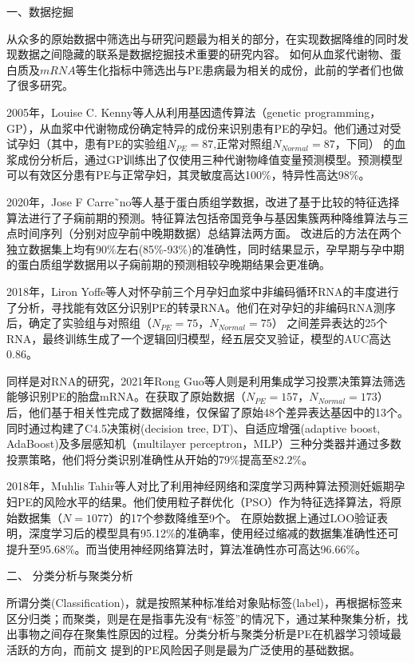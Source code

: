 一、数据挖掘

从众多的原始数据中筛选出与研究问题最为相关的部分，在实现数据降维的同时发现数据之间隐藏的联系是数据挖掘技术重要的研究内容。
如何从血浆代谢物、蛋白质及$mRNA$等生化指标中筛选出与PE患病最为相关的成份，此前的学者们也做了很多研究。

2005年，Louise C. Kenny等人\cite{Kenny2005}从利用基因遗传算法（genetic programming，GP），从血浆中代谢物成份确定特异的成份来识别患有PE的孕妇。他们通过对受试孕妇（其中，患有PE的实验组$N_{PE}=87$,正常对照组$N_{Normal}=87$，下同）
的血浆成份分析后，通过GP训练出了仅使用三种代谢物峰值变量预测模型。预测模型可以有效区分患有PE与正常孕妇，其灵敏度高达100\%，特异性高达98\%。

2020年，Jose F Carre˜no等人\cite{Carreno2020}基于蛋白质组学数据，改进了基于比较的特征选择算法进行了子痫前期的预测。特征算法包括帝国竞争与基因集簇两种降维算法与三点时间序列（分别对应孕前中晚期数据）总结算法两方面。
改进后的方法在两个独立数据集上均有90\%左右(85\%-93\%)的准确性，同时结果显示，孕早期与孕中期的蛋白质组学数据用以子痫前期的预测相较孕晚期结果会更准确。

2018年，Liron Yoffe等人\cite{Yoffe2018}对怀孕前三个月孕妇血浆中非编码循环RNA的丰度进行了分析，寻找能有效区分识别PE的转录RNA。他们在对孕妇的非编码RNA测序后，确定了实验组与对照组（$N_{PE}=75$，$N_{Normal}=75$）
之间差异表达的25个RNA，最终训练生成了一个逻辑回归模型，经五层交叉验证，模型的AUC高达0.86。

同样是对RNA的研究，2021年Rong Guo等人\cite{Guo2021}则是利用集成学习投票决策算法筛选能够识别PE的胎盘mRNA。在获取了原始数据（$N_{PE}=157$，$N_{Normal}=173$）后，他们基于相关性完成了数据降维，仅保留了原始48个差异表达基因中的13个。
同时通过构建了C4.5决策树(decision tree, DT)、自适应增强(adaptive boost, AdaBoost)及多层感知机（multilayer perceptron，MLP）三种分类器并通过多数投票策略，他们将分类识别准确性从开始的$79\%$提高至$82.2\%$。

2018年，Muhlis Tahir等人\cite{Tahir2018,Tahir2018-2}对比了利用神经网络和深度学习两种算法预测妊娠期孕妇PE的风险水平的结果。他们使用粒子群优化（PSO）作为特征选择算法，将原始数据集（$N=1077$）的17个参数降维至9个。
在原始数据上通过LOO验证表明，深度学习后的模型具有95.12\%的准确率，使用经过缩减的数据集准确性还可提升至95.68\%。而当使用神经网络算法时，算法准确性亦可高达96.66\%。

二、 分类分析与聚类分析

所谓分类(Classification)，就是按照某种标准给对象贴标签(label)，再根据标签来区分归类；而聚类，则是在是指事先没有“标签”的情况下，通过某种聚集分析，找出事物之间存在聚集性原因的过程。分类分析与聚类分析是PE在机器学习领域最活跃的方向，而前文
提到的PE风险因子则是最为广泛使用的基础数据。

